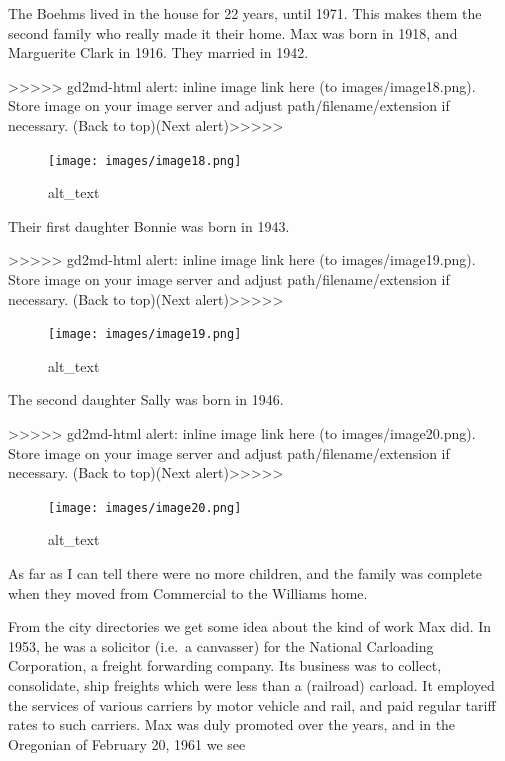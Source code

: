 \documentclass[
  12pt,
]{book}
\begin{document}
The Boehms lived in the house for 22 years, until 1971. This makes them the second family who really made it their home. Max was born in 1918, and Marguerite Clark in 1916. They married in 1942.

{\textgreater\textgreater\textgreater\textgreater\textgreater{} gd2md-html alert: inline image link here (to images/image18.png). Store image on your image server and adjust path/filename/extension if necessary. }(Back to top)(Next alert){\textgreater\textgreater\textgreater\textgreater\textgreater{} }

\begin{figure}
\centering
\texttt{[image: images/image18.png]}
\caption{alt\_text}
\end{figure}

Their first daughter Bonnie was born in 1943.

{\textgreater\textgreater\textgreater\textgreater\textgreater{} gd2md-html alert: inline image link here (to images/image19.png). Store image on your image server and adjust path/filename/extension if necessary. }(Back to top)(Next alert){\textgreater\textgreater\textgreater\textgreater\textgreater{} }

\begin{figure}
\centering
\texttt{[image: images/image19.png]}
\caption{alt\_text}
\end{figure}

The second daughter Sally was born in 1946.

{\textgreater\textgreater\textgreater\textgreater\textgreater{} gd2md-html alert: inline image link here (to images/image20.png). Store image on your image server and adjust path/filename/extension if necessary. }(Back to top)(Next alert){\textgreater\textgreater\textgreater\textgreater\textgreater{} }

\begin{figure}
\centering
\texttt{[image: images/image20.png]}
\caption{alt\_text}
\end{figure}

As far as I can tell there were no more children, and the family was complete when they moved from Commercial to the Williams home.

From the city directories we get some idea about the kind of work Max did. In 1953, he was a solicitor (i.e.~a canvasser) for the National Carloading Corporation, a freight forwarding company. Its business was to collect, consolidate, ship freights which were less than a (railroad) carload. It employed the services of various carriers by motor vehicle and rail, and paid regular tariff rates to such carriers. Max was duly promoted over the years, and in the Oregonian of February 20, 1961 we see
\end{document}
